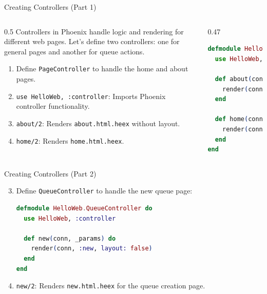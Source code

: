 \documentclass[aspectratio=169, table]{beamer}
\begin{document}
\begin{frame}[fragile]{Creating Controllers (Part 1)}
\vspace{20pt}

\begin{columns}
  \begin{column}[T]{0.5\textwidth}
    Controllers in Phoenix handle logic and rendering for different web pages.  
    Let’s define two controllers: one for general pages and another for queue actions.

    \begin{enumerate}
      \item Define \texttt{PageController} to handle the home and about pages.
      \item \texttt{use HelloWeb, :controller}: Imports Phoenix controller functionality.
      \item \texttt{about/2}: Renders \texttt{about.html.heex} without layout.
      \item \texttt{home/2}: Renders \texttt{home.html.heex}.
    \end{enumerate}
  \end{column}

  \begin{column}[T]{0.47\textwidth}
\begin{lstlisting}[language=Elixir, basicstyle=\ttfamily\footnotesize]
defmodule HelloWeb.PageController do
  use HelloWeb, :controller

  def about(conn, _params) do
    render(conn, :about, layout: false)
  end

  def home(conn, _params) do
    render(conn, :home, layout: false)
  end
end
\end{lstlisting}
  \end{column}
\end{columns}
\end{frame}


\begin{frame}[fragile]{Creating Controllers (Part 2)}
\vspace{20pt}

\begin{enumerate}
  \setcounter{enumi}{2}
  \item Define \texttt{QueueController} to handle the new queue page:
\begin{lstlisting}[language=Elixir, basicstyle=\ttfamily\footnotesize]
defmodule HelloWeb.QueueController do
  use HelloWeb, :controller

  def new(conn, _params) do
    render(conn, :new, layout: false)
  end
end
\end{lstlisting}

  \item \texttt{new/2}: Renders \texttt{new.html.heex} for the queue creation page.
\end{enumerate}
\end{frame}
\end{document}
